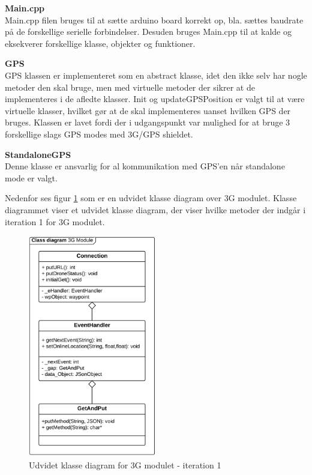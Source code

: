 \textbf{Main.cpp} \\
Main.cpp filen bruges til at sætte arduino board korrekt op, bla. sættes baudrate på de forskellige serielle forbindelser. Desuden bruges Main.cpp til at kalde og eksekverer forskellige klasse, objekter og funktioner.

\textbf{GPS} \\
GPS klassen er implementeret som en abstract klasse, idet den ikke selv har nogle metoder den skal bruge, men med virtuelle metoder der sikrer at de implementeres i de afledte klasser. 
Init og updateGPSPosition er valgt til at være virtuelle klasser, hvilket gør at de skal implementeres uanset hvilken GPS der bruges. Klassen er lavet fordi der i udgangspunkt var mulighed for at bruge 3 forskellige slags GPS modes med 3G/GPS shieldet. 

\textbf{StandaloneGPS}\\
Denne klasse er ansvarlig for al kommunikation med GPS'en når standalone mode er valgt. 

\newpage

Nedenfor ses figur \ref{fig:udvidet3G_it1} som er en udvidet klasse diagram over 3G modulet. Klasse diagrammet viser et udvidet klasse diagram, der viser hvilke metoder der indgår i iteration 1 for 3G modulet. 

\begin{figure}[H]
	\centering
	\includegraphics[width=0.50\textwidth]{Billeder/klasse_diagrammer/udvidet3G_iteration1.png}
	\vspace{0.5cm}
	\caption{Udvidet klasse diagram for 3G modulet - iteration 1}
	\label{fig:udvidet3G_it1}
\end{figure}


